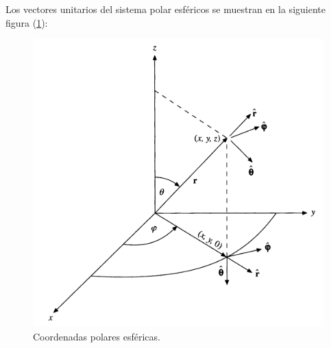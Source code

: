 Los vectores unitarios del sistema polar esféricos se muestran en la siguiente figura (\ref{fig:figura_coordenadas_esfericas_vu}):
\begin{figure}[H]
    \centering
    \includegraphics[scale=0.5]{Imagenes/CoordenadasEsfericasVectoresUnitarios.png}
    \caption{Coordenadas polares esféricas.}
    \label{fig:figura_coordenadas_esfericas_vu}
\end{figure}
